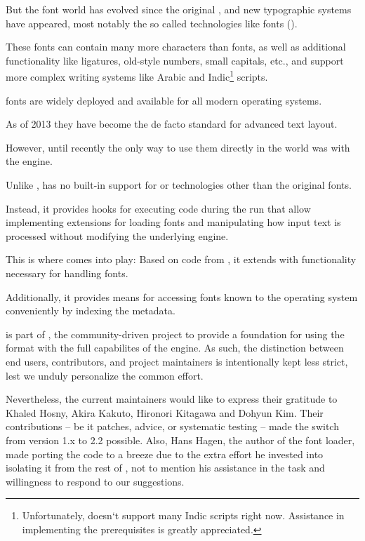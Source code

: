 But the font world has evolved since the original \TEX, and new
typographic systems have appeared, most notably the so called
 technologies like \OpenType fonts ().

These fonts can contain many more characters than \TEX fonts, as well
as additional functionality like ligatures, old-style numbers, small
capitals, etc., and support more complex writing systems like Arabic
and Indic\footnote{%
	Unfortunately,  doesn‘t support many Indic
	scripts right now.
	Assistance in implementing the prerequisites is greatly
	appreciated.
}
scripts.

\OpenType fonts are widely deployed and available for all modern
operating systems.

As of 2013 they have become the de facto standard for advanced text
layout.

However, until recently the only way to use them directly in the \TEX
world was with the \XETEX engine.

Unlike \XETEX, \LUATEX has no built-in support for \OpenType or
technologies other than the original \TEX fonts.

Instead, it provides hooks for executing \LUA code during the \TEX run
that allow implementing extensions for loading fonts and manipulating
how input text is processed without modifying the underlying engine.

This is where  comes into play:
Based on code from \CONTEXT, it extends \LUATEX with functionality necessary
for handling \OpenType fonts.

Additionally, it provides means for accessing fonts known to the operating
system conveniently by indexing the metadata.

\endsection


 is part of \LUALATEX, the community-driven
project to provide a foundation for using the \LATEX format with the
full capabilites of the \LUATEX engine.
%
As such, the distinction between end users, contributors, and project
maintainers is intentionally kept less strict, lest we unduly
personalize the common effort.

Nevertheless, the current maintainers would like to express their
gratitude to Khaled Hosny, Akira Kakuto, Hironori Kitagawa and Dohyun
Kim.
%
Their contributions -- be it patches, advice, or systematic
testing -- made the switch from version 1.x to 2.2 possible.
%
Also, Hans Hagen, the author of the font loader, made porting the
code to \LATEX a breeze due to the extra effort he invested into
isolating it from the rest of \CONTEXT, not to mention his assistance
in the task and willingness to respond to our suggestions.

